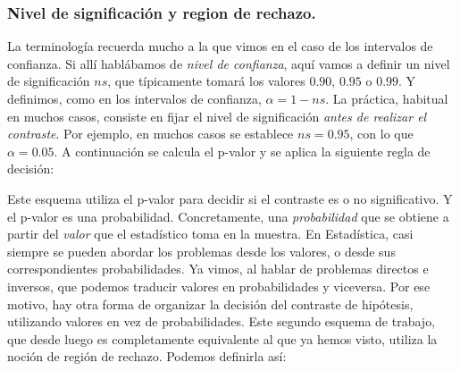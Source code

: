 \subsubsection*{Nivel de significación y region de rechazo.}

La terminología recuerda mucho a la que vimos en el caso de los intervalos de confianza. Si allí hablábamos de {\em nivel de confianza}, aquí vamos a definir un {\sf nivel de significación} $ns$, que típicamente tomará los valores $0.90$, $0.95$ o $0.99$. Y definimos, como en los intervalos de confianza, $\alpha=1-ns$. La práctica, habitual en muchos casos, consiste en fijar el nivel de significación {\em antes de realizar el contraste}. Por ejemplo, en muchos casos se establece $ns=0.95$, con lo que $\alpha=0.05$. A continuación se calcula el p-valor y se aplica la siguiente regla de decisión:

    \begin{center}
    \end{center}
Este esquema utiliza el p-valor para decidir si el contraste es o no significativo. Y el p-valor es una probabilidad. Concretamente, una {\em probabilidad} que se obtiene a partir del {\em valor} que el estadístico toma en la muestra. En Estadística, casi siempre se pueden abordar los problemas desde los valores, o desde sus correspondientes probabilidades. Ya vimos, al hablar de problemas directos e inversos, que podemos traducir valores en probabilidades y viceversa. Por ese motivo, hay otra forma de organizar la decisión del contraste de hipótesis, utilizando valores en vez de probabilidades. Este segundo esquema de trabajo, que desde luego es completamente equivalente al que ya hemos visto, utiliza la noción de {\sf región de rechazo}. Podemos definirla así:

